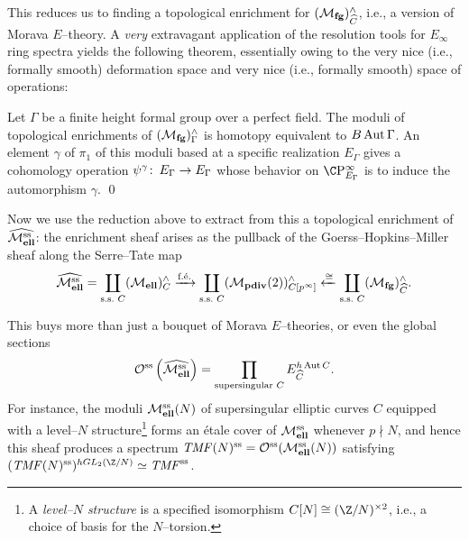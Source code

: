 This reduces us to finding a topological enrichment for $(\mathcal{M}_{\mathbf{fg}})^\wedge_{\widehat{C}}$, i.e., a version of Morava $E$--theory.  A \emph{very} extravagant application of the resolution tools for $E_\infty$ ring spectra yields the following theorem, essentially owing to the very nice (i.e., formally smooth) deformation space and very nice (i.e., formally smooth) space of operations:

\begin{theorem}\label{GHMTheoremForEThy}
Let $\Gamma$ be a finite height formal group over a perfect field.  The moduli of topological enrichments of $(\mathcal{M}_{\mathbf{fg}})^\wedge_\Gamma$ is homotopy equivalent to $B\operatorname{Aut} \Gamma$.  An element $\gamma$ of $\pi_1$ of this moduli based at a specific realization $E_\Gamma$ gives a cohomology operation $\psi^\gamma\colon\thinspace E_\Gamma \to E_\Gamma$ whose behavior on $\CP^\infty_{E_\Gamma}$ is to induce the automorphism $\gamma$. \qed
\end{theorem}

Now we use the reduction above to extract from this a topological enrichment of $\widehat{\mathcal{M}_{\mathbf{ell}}^{\mathrm{ss}}}$: the enrichment sheaf arises as the pullback of the Goerss--Hopkins--Miller sheaf along the Serre--Tate map \[\widehat{\mathcal{M}_{\mathbf{ell}}^{\mathrm{ss}}} = \coprod_{\text{s.s.\ $C$}} (\mathcal{M}_{\mathbf{ell}})^\wedge_C \xrightarrow{\text{f.\'e.}} \coprod_{\text{s.s.\ $C$}} (\mathcal{M}_{\mathbf{pdiv}}(2))^\wedge_{C[p^\infty]} \xleftarrow{\cong} \coprod_{\text{s.s.\ $C$}} (\mathcal{M}_{\mathbf{fg}})^\wedge_{\widehat C}.\]

\begin{remark}
This buys more than just a bouquet of Morava $E$--theories, or even the global sections \[\mathcal{O}^{\mathrm{ss}}\left(\widehat{\mathcal{M}_{\mathbf{ell}}^{\mathrm{ss}}}\right) = \prod_{\text{supersingular $C$}} E_{\widehat C}^{h\operatorname{Aut} C}.\]  For instance, the moduli $\mathcal{M}_{\mathbf{ell}}^{\mathrm{ss}}(N)$ of supersingular elliptic curves $C$ equipped with a level--$N$ structure\footnote{A \textit{level--$N$ structure} is a specified isomorphism $C[N] \cong (\Z/N)^{\times 2}$, i.e., a choice of basis for the $N$--torsion.} forms an \'etale cover of $\mathcal{M}_{\mathbf{ell}}^{\mathrm{ss}}$ whenever $p \nmid N$, and hence this sheaf produces a spectrum $\mathit{TMF}(N)^{\mathrm{ss}} = \mathcal{O}^{\mathrm{ss}}(\mathcal{M}_{\mathbf{ell}}^{\mathrm{ss}}(N))$ satisfying $(\TMF(N)^{\ss})^{hGL_2(\Z/N)} \simeq \TMF^{\ss}$.
\end{remark}







